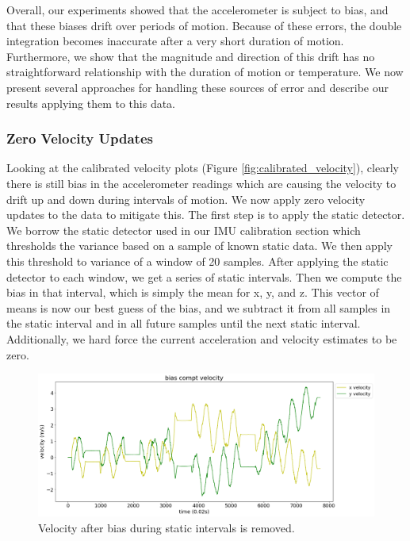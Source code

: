 \documentclass{article}
\begin{document}
      Overall, our experiments showed that the accelerometer is subject to bias, and that these biases drift over periods of motion. Because of these errors, the double integration becomes inaccurate after a very short duration of motion. Furthermore, we show that the magnitude and direction of this drift has no straightforward relationship with the duration of motion or temperature. We now present several approaches for handling these sources of error and describe our results applying them to this data.

    \subsubsection{Zero Velocity Updates} \label{section:zero_velocity_updates}

      Looking at the calibrated velocity plots (Figure \ref{fig:calibrated_velocity}), clearly there is still bias in the accelerometer readings which are causing the velocity to drift up and down during intervals of motion. We now apply zero velocity updates to the data to mitigate this. The first step is to apply the static detector. We borrow the static detector used in our IMU calibration section which thresholds the variance based on a sample of known static data. We then apply this threshold to variance of a window of 20 samples. After applying the static detector to each window, we get a series of static intervals. Then we compute the bias in that interval, which is simply the mean for x, y, and z. This vector of means is now our best guess of the bias, and we subtract it from all samples in the static interval and in all future samples until the next static interval. Additionally, we hard force the current acceleration and velocity estimates to be zero.

      \begin{figure}[H]
        \centering
        \includegraphics[width=1\linewidth]{./images/bias-compt-velocity.png}
        \caption{Velocity after bias during static intervals is removed.}
        \label{fig:bias-removed}
      \end{figure}
\end{document}
